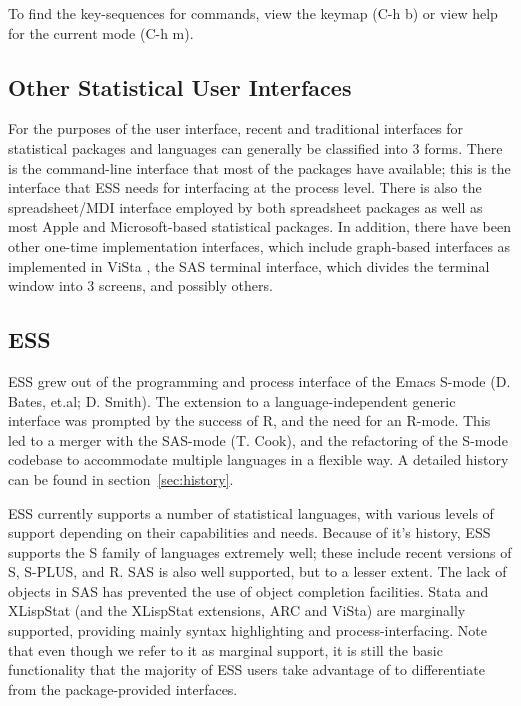 \documentclass{article}
\begin{document}
To find the key-sequences for commands, view the keymap (C-h b) or
view help for the current mode (C-h m).



\subsection{Other Statistical User Interfaces}
\label{sec:intro:UI}

For the purposes of the user interface, recent and traditional
interfaces for statistical packages and languages can generally be
classified into 3 forms.  There is the command-line interface that
most of the packages have available; this is the interface that ESS
needs for interfacing at the process level.  There is also the
spreadsheet/MDI interface employed by both spreadsheet packages as
well as most Apple and Microsoft-based statistical packages.  In
addition, there have been other one-time implementation interfaces,
which include graph-based interfaces as implemented in ViSta
\citep{youn:lubi:1995}, the SAS terminal interface, which divides the
terminal window into 3 screens, and possibly others.


\subsection{ESS}
\label{sec:intro:ESS}


ESS grew out of the programming and process interface of the Emacs
S-mode (D. Bates, et.al; D. Smith).  The extension to a
language-independent generic interface was prompted by the success of
R, and the need for an R-mode.  This led to a merger with the SAS-mode
(T. Cook), and the refactoring of the S-mode codebase to accommodate
multiple languages in a flexible way.  A detailed  history can be
found in section~\ref{sec:history}.

ESS currently supports a number of statistical languages, with various
levels of support depending on their capabilities and needs.  Because
of it's history, ESS supports the S family of languages extremely
well; these include recent versions of S, S-PLUS, and R.  SAS is also
well supported, but to a lesser extent.  The lack of objects in SAS
has prevented the use of object completion facilities.  Stata and
XLispStat (and the XLispStat extensions, ARC and ViSta) are marginally
supported, providing mainly syntax highlighting and
process-interfacing.  Note that even though we refer to it as marginal
support, it is still the basic functionality that the majority of ESS
users take advantage of to differentiate from the package-provided
interfaces.
\end{document}
